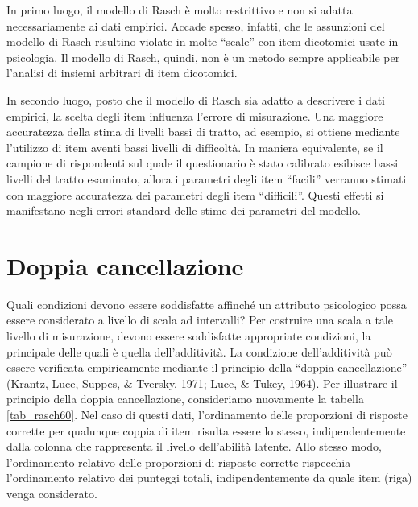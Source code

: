 In primo luogo, il modello di Rasch è molto restrittivo e non si adatta necessariamente ai dati empirici. Accade spesso, infatti, che le assunzioni del modello di Rasch risultino violate in molte ``scale'' con item dicotomici usate in psicologia. Il modello di Rasch, quindi, non è un metodo sempre applicabile per l'analisi di insiemi arbitrari di item dicotomici. 

In secondo luogo, posto che il modello di Rasch sia adatto a descrivere i dati empirici, la scelta degli item influenza l'errore di misurazione.   Una maggiore accuratezza della stima di livelli bassi di tratto, ad esempio, si ottiene mediante l'utilizzo di item aventi bassi livelli di difficoltà. In maniera equivalente, se il campione di rispondenti sul quale il questionario è stato calibrato esibisce bassi livelli del tratto esaminato, allora  i parametri degli item ``facili'' verranno  stimati con maggiore accuratezza dei parametri degli item ``difficili''. Questi  effetti si manifestano negli errori standard delle stime dei parametri del modello.

\section{Doppia cancellazione} 

Quali condizioni devono essere soddisfatte affinché un attributo psicologico  possa essere considerato a livello di scala ad intervalli? Per costruire una scala a tale livello di misurazione, devono essere soddisfatte appropriate condizioni, la principale delle quali è quella dell'additività.  La condizione dell'additività può essere verificata empiricamente mediante il principio della ``doppia cancellazione'' (Krantz, Luce, Suppes, \& Tversky, 1971; Luce, \& Tukey, 1964). 
Per illustrare il principio della doppia cancellazione, consideriamo nuovamente la tabella \ref{tab_rasch60}.  Nel caso di questi dati, l'ordinamento delle proporzioni di risposte corrette per qualunque coppia di item risulta essere lo stesso, indipendentemente dalla colonna che rappresenta il livello dell'abilità latente. Allo stesso modo, l'ordinamento relativo delle  proporzioni di risposte corrette rispecchia l'ordinamento relativo dei punteggi totali, indipendentemente da quale item (riga) venga considerato. 

